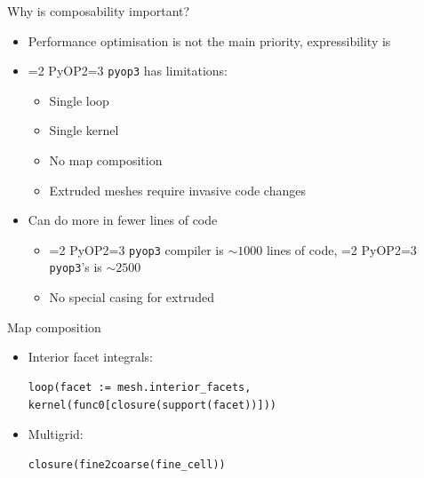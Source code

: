 \documentclass[aspectratio=169]{beamer}
\def\pyop#1{\ifnum#1=2 {PyOP2}\else \ifnum#1=3 {\texttt{pyop3}}\fi \fi}
\begin{document}
\begin{frame}{Why is composability important?}
  \begin{itemize}
    \item Performance optimisation is not the main priority, expressibility is
    \item \pyop2 has limitations:
      \begin{itemize}
        \item Single loop
        \item Single kernel
        \item No map composition
        \item Extruded meshes require invasive code changes
      \end{itemize}
    \item Can do more in fewer lines of code
      \begin{itemize}
        \item \pyop3 compiler is $\sim1000$ lines of code, \pyop2's is $\sim2500$
        \item No special casing for extruded
      \end{itemize}
  \end{itemize}
\end{frame}

\begin{frame}[fragile]{Map composition}
  \begin{itemize}
    \item Interior facet integrals: 
      \begin{tcolorbox}
        \begin{verbatim}
loop(facet := mesh.interior_facets, kernel(func0[closure(support(facet))]))
        \end{verbatim}
      \end{tcolorbox}

    \item Multigrid:
      \begin{tcolorbox}
        \begin{verbatim}
closure(fine2coarse(fine_cell))
        \end{verbatim}
      \end{tcolorbox}
  \end{itemize}
\end{frame}
\end{document}

